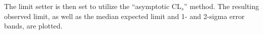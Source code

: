 
The limit setter is then set to utilize the ``asymptotic CL$_{s}$''
\cite{cite:asympcls1,cite:asympcls2} method. The resulting observed limit, as well as
the median expected limit and 1- and 2-sigma error bands, are plotted.
